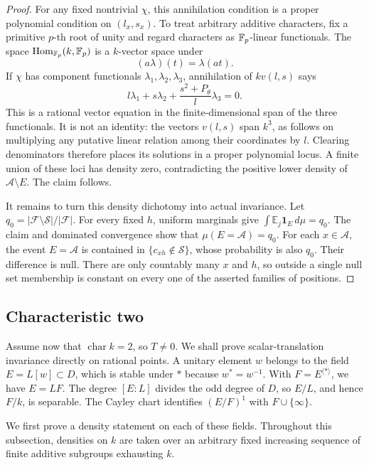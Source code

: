 \begin{proof}
For any fixed nontrivial \(\chi\), this annihilation condition is a
proper polynomial condition on \((l_x,s_x)\).  To treat arbitrary
additive characters, fix a primitive
\(p\)-th root of unity and regard characters as
\(\mathbb F_p\)-linear functionals.  The space
\(\operatorname{Hom}_{\mathbb F_p}(k,\mathbb F_p)\) is a \(k\)-vector space under
\[
 (a\lambda)(t)=\lambda(at).
\]
If \(\chi\) has component functionals \(\lambda_1,\lambda_2,\lambda_3\),
annihilation of \(kv(l,s)\) says
\[
 l\lambda_1+s\lambda_2+\frac{s^2+P_\theta}{l}\lambda_3=0.
\]
This is a rational vector equation in the finite-dimensional span of
the three functionals.  It is not an identity: the vectors \(v(l,s)\)
span \(k^3\), as follows on multiplying any putative linear relation
among their coordinates by \(l\).  Clearing denominators therefore
places its solutions in a proper polynomial locus.  A finite union of
these loci has density zero, contradicting the positive lower density
of \(\mathcal A\setminus E\).  The claim follows.

It remains to turn this density dichotomy into actual invariance.
Let \(q_0=|\mathcal F\setminus\mathcal S|/|\mathcal F|\).  For every
fixed \(h\), uniform marginals give
\(\int\mathbb E_j\boldsymbol1_E\,d\mu=q_0\).  The claim and dominated
convergence show that \(\mu(E=\mathcal A)=q_0\).  For each
\(x\in\mathcal A\), the event \(E=\mathcal A\) is contained in
\(\{c_{xh}\notin\mathcal S\}\), whose probability is also \(q_0\).
Their difference is null.  There are only countably many \(x\) and
\(h\), so outside a single null set membership is constant on every
one of the asserted families of positions.
\end{proof}

\subsection{Characteristic two}

Assume now that \(\operatorname{char}k=2\), so \(T\ne0\).  We shall
prove scalar-translation invariance directly on rational points.  A
unitary element \(w\) belongs to the field \(E=L[w]\subset D\), which
is stable under \(*\) because \(w^*=w^{-1}\).  With
\(F=E^{\langle *\rangle}\), we
have \(E=LF\).  The degree \([E:L]\) divides the odd degree of \(D\),
so \(E/L\), and hence \(F/k\), is separable.  The Cayley chart identifies
\((E/F)^1\) with \(F\cup\{\infty\}\).

We first prove a density statement on each of these fields.  Throughout
this subsection, densities on \(k\) are taken over an arbitrary fixed
increasing sequence of finite additive subgroups exhausting \(k\).

